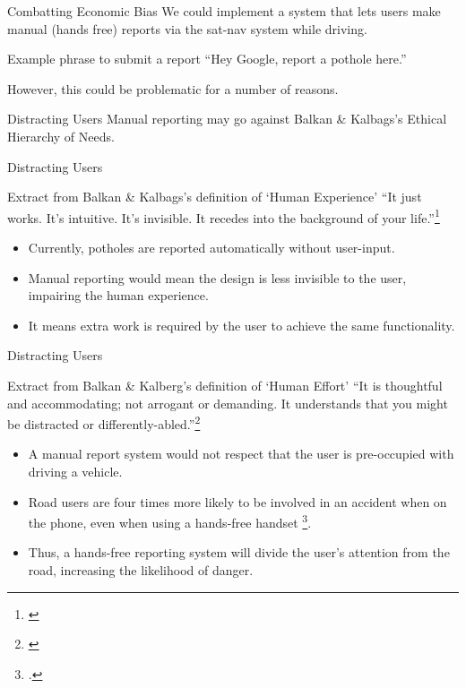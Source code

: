 \documentclass{beamer}
\begin{document}
\begin{frame}{Combatting Economic Bias}
    We could implement a system that lets users make manual (hands free) reports via the sat-nav system while driving.

    \begin{exampleblock}{Example phrase to submit a report}
        ``Hey Google, report a pothole here.''
    \end{exampleblock}

    However, this could be problematic for a number of reasons.
\end{frame}

\begin{frame}{Distracting Users}
    Manual reporting may go against Balkan \& Kalbags's Ethical Hierarchy of Needs.
\end{frame}

\begin{frame}{Distracting Users}
    \begin{block}{Extract from Balkan \& Kalbags's definition of `Human Experience'}
        ``It just works. It's intuitive. It's invisible. It recedes into the background of your life.''\footnote[frame]{\cite{ethical-hierarchy-of-needs}}
    \end{block}

    \begin{itemize}
        \item Currently, potholes are reported automatically without user-input.
        \item Manual reporting would mean the design is \alert{less invisible} to the user, \alert{impairing the human experience}.
        \item It means extra work is required by the user to achieve the same functionality.
    \end{itemize}
\end{frame}

\begin{frame}{Distracting Users}
    \begin{block}{Extract from Balkan \& Kalberg's definition of `Human Effort'}
        ``It is thoughtful and accommodating; not arrogant or demanding. It understands that you might be distracted or differently-abled.''\footnote[frame]{\cite{ethical-hierarchy-of-needs}}
    \end{block}

    \begin{itemize}
        \item A manual report system \alert{would not respect that the user is pre-occupied} with driving a vehicle.
        \item Road users are four times more likely to be involved in an accident when on the phone, even when using a hands-free handset \footcite{hands-free-call}.
        \item Thus, a hands-free reporting system will divide the user's attention from the road, increasing the likelihood of danger.
    \end{itemize}
\end{frame}
\end{document}
